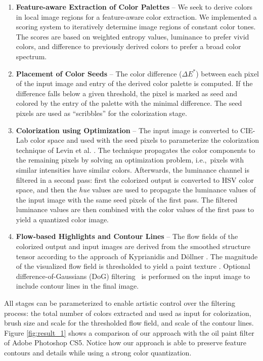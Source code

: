 \begin{columns}
{\begin{minipage}[t]{1.0\linewidth}
\begin{multicols*}{2}
    	\begin{enumerate}
			\item \textbf{Feature-aware Extraction of Color Palettes} -- We seek to derive colors in local image regions for a feature-aware color extraction.
We implemented a scoring system to iteratively determine image regions of constant color tones. The scores are based on weighted entropy values, luminance to prefer vivid colors, and difference to previously derived colors to prefer a broad color spectrum.\\
			\item \textbf{Placement of Color Seeds} -- The color difference ($\Delta E^*$) between each pixel of the input image and entry of the derived color palette is computed. If the difference falls below a given threshold, the pixel is marked as seed and colored by the entry of the palette with the minimal difference. The seed pixels are used as \enquote{scribbles} for the colorization stage.\\
			\item \textbf{Colorization using Optimization} -- The input image is converted to CIE-Lab color space and used with the seed pixels to parameterize the colorization technique of Levin et al. . The technique propagates the color components to the remaining pixels by solving an optimization problem, i.e.,~pixels with similar intensities have similar colors. Afterwards, the luminance channel is filtered in a second pass: first the colorized output is converted to HSV color space, and then the \emph{hue} values are used to propagate the luminance values of the input image with the same seed pixels of the first pass. The filtered luminance values are then combined with the color values of the first pass to yield a quantized color image.\\
			\item \textbf{Flow-based Highlights and Contour Lines} -- The flow fields of the colorized output and input images are derived from the smoothed structure tensor according to the approach of Kyprianidis and D{\"o}llner . The magnitude of the visualized flow field is thresholded to yield a paint texture \cite{Hertzmann2002}. Optional difference-of-Gaussians (DoG) filtering~\cite{Gooch2004} is performed on the input image to include contour lines in the final image.\\
		\end{enumerate}

		All stages can be parameterized to enable artistic control over the filtering process: the total number of colors extracted and used as input for colorization, brush size and scale for the thresholded flow field, and scale of the contour lines. Figure \ref{fig:result_1} shows a comparison of our approach with the oil paint filter of Adobe Photoshop CS5. Notice how our approach is able to preserve feature contours and details while using a strong color quantization.


\end{multicols*}
\end{minipage}}
\end{columns}
